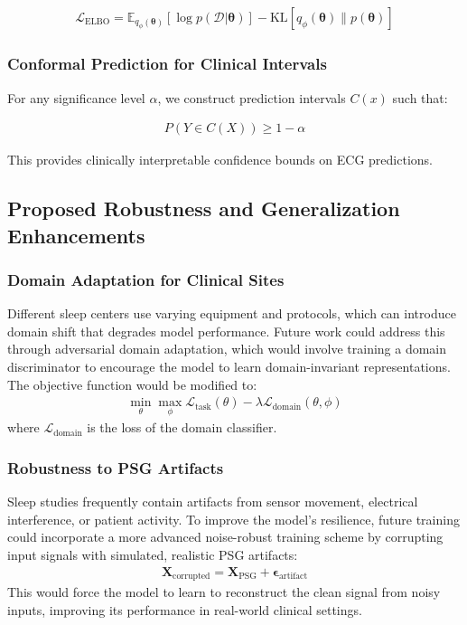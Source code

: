 \documentclass[10pt, conference]{IEEEtran}
\begin{document}
\begin{align}
\mathcal{L}_{\text{ELBO}} = \mathbb{E}_{q_\phi(\boldsymbol{\theta})}[\log p(\mathcal{D}|\boldsymbol{\theta})] - \text{KL}[q_\phi(\boldsymbol{\theta}) \| p(\boldsymbol{\theta})]
\end{align}

\subsubsection{Conformal Prediction for Clinical Intervals}
For any significance level $\alpha$, we construct prediction intervals $C(x)$ such that:

\begin{align}
P(Y \in C(X)) \geq 1 - \alpha
\end{align}

This provides clinically interpretable confidence bounds on ECG predictions.

\subsection{Proposed Robustness and Generalization Enhancements}

\subsubsection{Domain Adaptation for Clinical Sites}
Different sleep centers use varying equipment and protocols, which can introduce domain shift that degrades model performance. Future work could address this through adversarial domain adaptation, which would involve training a domain discriminator to encourage the model to learn domain-invariant representations. The objective function would be modified to:
\begin{align}
\min_{\theta} \max_{\phi} \mathcal{L}_{\text{task}}(\theta) - \lambda \mathcal{L}_{\text{domain}}(\theta, \phi)
\end{align}
where $\mathcal{L}_{\text{domain}}$ is the loss of the domain classifier.

\subsubsection{Robustness to PSG Artifacts}
Sleep studies frequently contain artifacts from sensor movement, electrical interference, or patient activity. To improve the model's resilience, future training could incorporate a more advanced noise-robust training scheme by corrupting input signals with simulated, realistic PSG artifacts:
\begin{align}
\mathbf{X}_{\text{corrupted}} = \mathbf{X}_{\text{PSG}} + \boldsymbol{\epsilon}_{\text{artifact}}
\end{align}
This would force the model to learn to reconstruct the clean signal from noisy inputs, improving its performance in real-world clinical settings.
\end{document}

